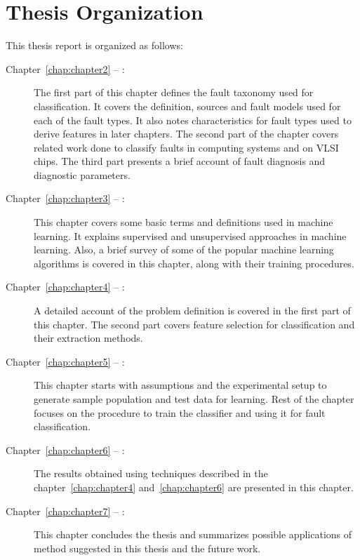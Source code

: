 \section{Thesis Organization}
This thesis report is organized as follows:
\begin{description}
\item[Chapter~\ref{chap:chapter2} -- :] The first part of this chapter defines the fault taxonomy used for classification. It covers the definition, sources and fault models used for each of the fault types. It also notes characteristics for fault types used to derive features in later chapters. The second part of the chapter covers related work done to classify faults in computing systems and on VLSI chips. The third part presents a brief account of fault diagnosis and diagnostic parameters.

\item[Chapter~\ref{chap:chapter3} -- :] This chapter covers some basic terms and definitions used in machine learning. It explains supervised and unsupervised approaches in machine learning. Also, a brief survey of some of the popular machine learning algorithms is covered in this chapter, along with their training procedures.
 
\item[Chapter~\ref{chap:chapter4} -- :] A detailed account of the problem definition is covered in the first part of this chapter. The second part covers feature selection for classification and their extraction methods.

\item[Chapter~\ref{chap:chapter5} -- :] This chapter starts with assumptions and the experimental setup to generate sample population and test data for learning. Rest of the chapter focuses on the procedure to train the classifier and using it for fault classification.

\item[Chapter~\ref{chap:chapter6} -- :] The results obtained using techniques described in the chapter~\ref{chap:chapter4} and~\ref{chap:chapter6} are presented in this chapter.

\item[Chapter~\ref{chap:chapter7} -- :] This chapter concludes the thesis and summarizes possible applications of method suggested in this thesis and the future work.
\end{description}
